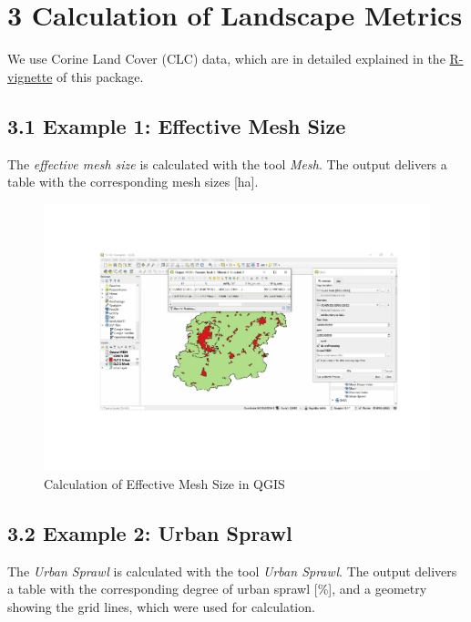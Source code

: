 \documentclass[]{article}
\begin{document}
\section{3 Calculation of Landscape
Metrics}\label{calculation-of-landscape-metrics}

We use Corine Land Cover (CLC) data, which are in detailed explained in
the
\href{https://github.com/raff-k/VLSM/blob/master/vignettes/vignette_R.pdf}{R-vignette}
of this package.

\subsection{3.1 Example 1: Effective Mesh
Size}\label{example-1-effective-mesh-size}

The \emph{effective mesh size} is calculated with the tool \emph{Mesh}.
The output delivers a table with the corresponding mesh sizes {[}ha{]}.

\begin{figure}[H]

{\centering \includegraphics[width=1\linewidth]{vignette_QGIS_files/figure-latex/unnamed-chunk-3-1} 

}

\caption{Calculation of Effective Mesh Size in QGIS}\label{fig:unnamed-chunk-3}
\end{figure}

\subsection{3.2 Example 2: Urban Sprawl}\label{example-2-urban-sprawl}

The \emph{Urban Sprawl} is calculated with the tool \emph{Urban Sprawl}.
The output delivers a table with the corresponding degree of urban
sprawl {[}\%{]}, and a geometry showing the grid lines, which were used
for calculation.
\end{document}
